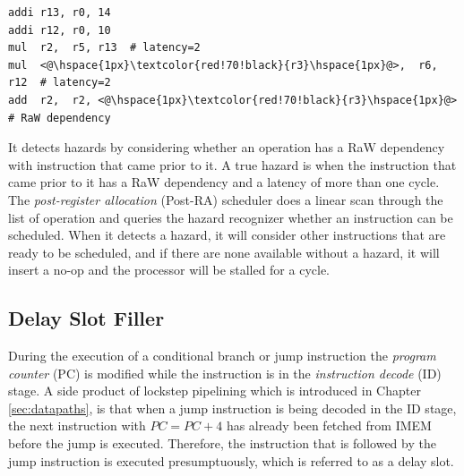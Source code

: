 \lstset{style=customasm}
\begin{lstlisting}
addi r13, r0, 14
addi r12, r0, 10
mul  r2,  r5, r13  # latency=2
mul  <@\hspace{1px}\textcolor{red!70!black}{r3}\hspace{1px}@>,  r6, r12  # latency=2
add  r2,  r2, <@\hspace{1px}\textcolor{red!70!black}{r3}\hspace{1px}@>   # RaW dependency
\end{lstlisting}

It detects hazards by considering whether an operation has a RaW dependency with instruction that came prior to it. A true hazard is when the instruction that came prior to it has a RaW dependency and a latency of more than one cycle. The \emph{post-register allocation} (Post-RA) scheduler does a linear scan through the list of operation and queries the hazard recognizer whether an instruction can be scheduled. When it detects a hazard, it will consider other instructions that are ready to be scheduled, and if there are none available without a hazard, it will insert a no-op and the processor will be stalled for a cycle.

\subsection{Delay Slot Filler}
During the execution of a conditional branch or jump instruction the \emph{program counter} (PC) is modified while the instruction is in the \emph{instruction decode} (ID) stage. A side product of lockstep pipelining which is introduced in Chapter \ref{sec:datapaths}, is that when a jump instruction is being decoded in the ID stage, the next instruction with $PC = PC+4$ has already been fetched from IMEM before the jump is executed. Therefore, the instruction that is followed by the jump instruction is executed presumptuously, which is referred to as a delay slot.


